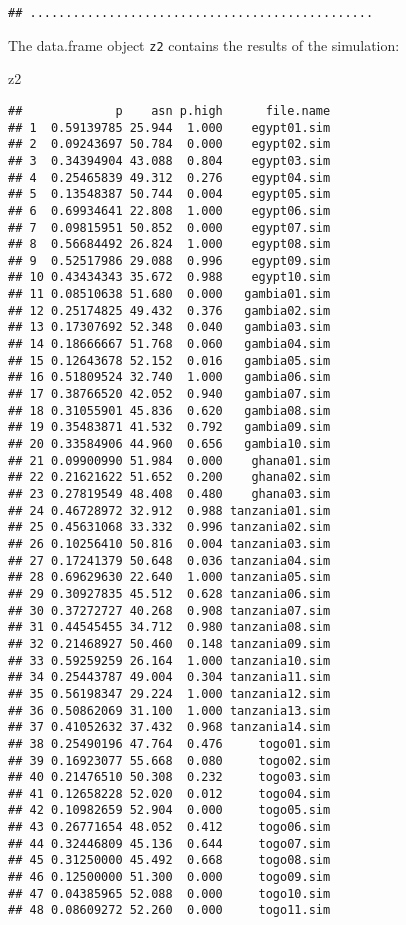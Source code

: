 \documentclass[
  12pt,
  a4paper]{book}
\newenvironment{Shaded}{\begin{snugshade}}{\end{snugshade}}
\newcommand{\NormalTok}[1]{#1}
\begin{document}
\begin{verbatim}
## ................................................
\end{verbatim}

The data.frame object \texttt{z2} contains the results of the simulation:

\begin{Shaded}
\begin{Highlighting}[]
\NormalTok{z2}
\end{Highlighting}
\end{Shaded}

\begin{verbatim}
##             p    asn p.high      file.name
## 1  0.59139785 25.944  1.000    egypt01.sim
## 2  0.09243697 50.784  0.000    egypt02.sim
## 3  0.34394904 43.088  0.804    egypt03.sim
## 4  0.25465839 49.312  0.276    egypt04.sim
## 5  0.13548387 50.744  0.004    egypt05.sim
## 6  0.69934641 22.808  1.000    egypt06.sim
## 7  0.09815951 50.852  0.000    egypt07.sim
## 8  0.56684492 26.824  1.000    egypt08.sim
## 9  0.52517986 29.088  0.996    egypt09.sim
## 10 0.43434343 35.672  0.988    egypt10.sim
## 11 0.08510638 51.680  0.000   gambia01.sim
## 12 0.25174825 49.432  0.376   gambia02.sim
## 13 0.17307692 52.348  0.040   gambia03.sim
## 14 0.18666667 51.768  0.060   gambia04.sim
## 15 0.12643678 52.152  0.016   gambia05.sim
## 16 0.51809524 32.740  1.000   gambia06.sim
## 17 0.38766520 42.052  0.940   gambia07.sim
## 18 0.31055901 45.836  0.620   gambia08.sim
## 19 0.35483871 41.532  0.792   gambia09.sim
## 20 0.33584906 44.960  0.656   gambia10.sim
## 21 0.09900990 51.984  0.000    ghana01.sim
## 22 0.21621622 51.652  0.200    ghana02.sim
## 23 0.27819549 48.408  0.480    ghana03.sim
## 24 0.46728972 32.912  0.988 tanzania01.sim
## 25 0.45631068 33.332  0.996 tanzania02.sim
## 26 0.10256410 50.816  0.004 tanzania03.sim
## 27 0.17241379 50.648  0.036 tanzania04.sim
## 28 0.69629630 22.640  1.000 tanzania05.sim
## 29 0.30927835 45.512  0.628 tanzania06.sim
## 30 0.37272727 40.268  0.908 tanzania07.sim
## 31 0.44545455 34.712  0.980 tanzania08.sim
## 32 0.21468927 50.460  0.148 tanzania09.sim
## 33 0.59259259 26.164  1.000 tanzania10.sim
## 34 0.25443787 49.004  0.304 tanzania11.sim
## 35 0.56198347 29.224  1.000 tanzania12.sim
## 36 0.50862069 31.100  1.000 tanzania13.sim
## 37 0.41052632 37.432  0.968 tanzania14.sim
## 38 0.25490196 47.764  0.476     togo01.sim
## 39 0.16923077 55.668  0.080     togo02.sim
## 40 0.21476510 50.308  0.232     togo03.sim
## 41 0.12658228 52.020  0.012     togo04.sim
## 42 0.10982659 52.904  0.000     togo05.sim
## 43 0.26771654 48.052  0.412     togo06.sim
## 44 0.32446809 45.136  0.644     togo07.sim
## 45 0.31250000 45.492  0.668     togo08.sim
## 46 0.12500000 51.300  0.000     togo09.sim
## 47 0.04385965 52.088  0.000     togo10.sim
## 48 0.08609272 52.260  0.000     togo11.sim
\end{verbatim}
\end{document}
